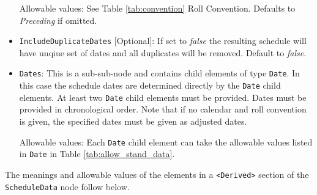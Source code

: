 \begin{itemize}
Allowable values: See Table \ref{tab:convention} Roll Convention. Defaults to \emph{Preceding} if omitted.

\item \lstinline!IncludeDuplicateDates! [Optional]: If set to \emph{false} the resulting schedule will have unqiue set of dates and all duplicates will be removed. Default to \emph{false}.

\item \lstinline!Dates!: This is a sub-sub-node and contains child elements of type
  \lstinline!Date!. In this case the schedule dates are determined
  directly by the \lstinline!Date! child elements.  At least two
  \lstinline!Date! child elements must be provided. Dates must be provided in chronological order. Note that if no calendar and roll convention is given, the specified dates must be given as adjusted dates.    

  Allowable values: Each \lstinline!Date!  child element can take the allowable values listed in \lstinline!Date! in
  Table \ref{tab:allow_stand_data}.

\end{itemize}

\medskip
The meanings and allowable values of the elements in a {\tt <Derived>} section of the \lstinline!ScheduleData! node follow below.

